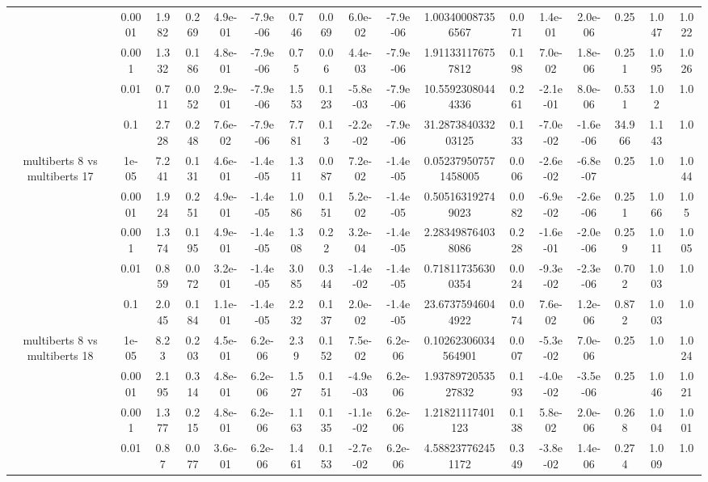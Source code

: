 \begin{tabular}{|c|c|c|c|c|c|c|c|c|c|c|c|c|c|c|c|c|}
 & 0.0001 & 1.982 & 0.269 & 4.9e-01 & -7.9e-06 & 0.746 & 0.069 & 6.0e-02 & -7.9e-06 & 1.003400087356567 & 0.071 & 1.4e-01 & 2.0e-06 & 0.25 & 1.047 & 1.022 \\
 & 0.001 & 1.332 & 0.186 & 4.8e-01 & -7.9e-06 & 0.75 & 0.06 & 4.4e-03 & -7.9e-06 & 1.911331176757812 & 0.198 & 7.0e-02 & 1.8e-06 & 0.251 & 1.095 & 1.026 \\
 & 0.01 & 0.711 & 0.052 & 2.9e-01 & -7.9e-06 & 1.553 & 0.123 & -5.8e-03 & -7.9e-06 & 10.55923080444336 & 0.261 & -2.1e-01 & 8.0e-06 & 0.531 & 1.02 & 1.0 \\
 & 0.1 & 2.728 & 0.248 & 7.6e-02 & -7.9e-06 & 7.781 & 0.13 & -2.2e-02 & -7.9e-06 & 31.287384033203125 & 0.133 & -7.0e-02 & -1.6e-06 & 34.966 & 1.143 & 1.0 \\
\hline
\multirow{5}{*}{multiberts 8 vs multiberts 17} & 1e-05 & 7.241 & 0.131 & 4.6e-01 & -1.4e-05 & 1.311 & 0.087 & 7.2e-02 & -1.4e-05 & 0.052379507571458005 & 0.006 & -2.6e-02 & -6.8e-07 & 0.25 & 1.0 & 1.044 \\
 & 0.0001 & 1.924 & 0.251 & 4.9e-01 & -1.4e-05 & 1.086 & 0.151 & 5.2e-02 & -1.4e-05 & 0.505163192749023 & 0.082 & -6.9e-02 & -2.6e-06 & 0.251 & 1.066 & 1.05 \\
 & 0.001 & 1.374 & 0.195 & 4.9e-01 & -1.4e-05 & 1.308 & 0.22 & 3.2e-04 & -1.4e-05 & 2.283498764038086 & 0.228 & -1.6e-01 & -2.0e-06 & 0.259 & 1.011 & 1.005 \\
 & 0.01 & 0.859 & 0.072 & 3.2e-01 & -1.4e-05 & 3.085 & 0.344 & -1.4e-02 & -1.4e-05 & 0.718117356300354 & 0.024 & -9.3e-02 & -2.3e-06 & 0.702 & 1.003 & 1.0 \\
 & 0.1 & 2.045 & 0.184 & 1.1e-01 & -1.4e-05 & 2.232 & 0.137 & 2.0e-02 & -1.4e-05 & 23.67375946044922 & 0.074 & 7.6e-02 & 1.2e-06 & 0.872 & 1.003 & 1.0 \\
\hline
\multirow{5}{*}{multiberts 8 vs multiberts 18} & 1e-05 & 8.23 & 0.203 & 4.5e-01 & 6.2e-06 & 2.39 & 0.152 & 7.5e-02 & 6.2e-06 & 0.10262306034564901 & 0.007 & -5.3e-02 & 7.0e-06 & 0.25 & 1.0 & 1.024 \\
 & 0.0001 & 2.195 & 0.314 & 4.8e-01 & 6.2e-06 & 1.527 & 0.151 & -4.9e-03 & 6.2e-06 & 1.9378972053527832 & 0.193 & -4.0e-02 & -3.5e-06 & 0.25 & 1.046 & 1.021 \\
 & 0.001 & 1.377 & 0.215 & 4.8e-01 & 6.2e-06 & 1.163 & 0.135 & -1.1e-02 & 6.2e-06 & 1.21821117401123 & 0.138 & 5.8e-02 & 2.0e-06 & 0.268 & 1.004 & 1.001 \\
 & 0.01 & 0.87 & 0.077 & 3.6e-01 & 6.2e-06 & 1.461 & 0.153 & -2.7e-02 & 6.2e-06 & 4.588237762451172 & 0.349 & -3.8e-02 & 1.4e-06 & 0.274 & 1.009 & 1.0 \\

\end{tabular}
